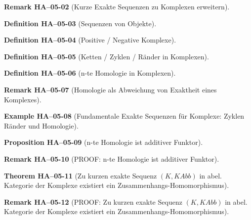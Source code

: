 \documentclass[10pt, letterpaper]{article}
\newcommand{\CustomHeading}[3]{%
  \par\medskip\noindent%
  \textbf{#1 #2} \textnormal{(#3)}.\enskip%
}
\newenvironment{DEF}[2]{\CustomHeading{Definition}{#1}{#2}}{}
\newenvironment{PROP}[2]{\CustomHeading{Proposition}{#1}{#2}}{}
\newenvironment{THEO}[2]{\CustomHeading{Theorem}{#1}{#2}}{}
\newenvironment{REM}[2]{\CustomHeading{Remark}{#1}{#2}}{}
\newenvironment{EXA}[2]{\CustomHeading{Example}{#1}{#2}}{}
\begin{document}
\begin{REM}{HA--05-02}{Kurze Exakte Sequenzen zu Komplexen erweitern}
\end{REM}

\begin{DEF}{HA--05-03}{Sequenzen von Objekte}
\end{DEF}

\begin{DEF}{HA--05-04}{Positive / Negative Komplexe}
\end{DEF}

\begin{DEF}{HA--05-05}{Ketten / Zyklen / Ränder in Komplexen}
\end{DEF}

\begin{DEF}{HA--05-06}{n-te Homologie in Komplexen}
\end{DEF}

\begin{REM}{HA--05-07}{Homologie als Abweichung von Exaktheit eines Komplexes}
\end{REM}

\begin{EXA}{HA--05-08}{Fundamentale Exakte Sequenzen für Komplexe: Zyklen Ränder und Homologie}
\end{EXA}

\begin{PROP}{HA--05-09}{n-te Homologie ist additiver Funktor}
\end{PROP}

\begin{REM}{HA--05-10}{PROOF: n-te Homologie ist additiver Funktor}
\end{REM}

\begin{THEO}{HA--05-11}{Zu kurzen exakte Sequenz $(K,KAbb)$ in abel. Kategorie der Komplexe existiert ein Zusammenhangs-Homomorphismus}
\end{THEO}

\begin{REM}{HA--05-12}{PROOF: Zu kurzen exakte Sequenz $(K,KAbb)$ in abel. Kategorie der Komplexe existiert ein Zusammenhangs-Homomorphismus}
\end{REM}
\end{document}

